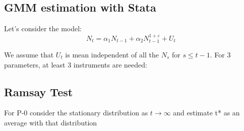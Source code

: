    


    \subsection{GMM estimation with Stata}

    Let's consider the model:
    \begin{equation}
        N_{t} = \alpha_1 N_{t-1} + \alpha_2 N_{t-1}^{1 + \varepsilon} + U_t\label{eq:equation1}
    \end{equation}

    We assume that $U_t$ is mean independent of all the $N_s$ for $s\leq t-1$. For 3 parameters, at least 3 instruments are needed:

    


    \subsection{Ramsay Test}





For P-0 consider the stationary distribution as $t \to \infty $ and estimate t* as an average with that distribution